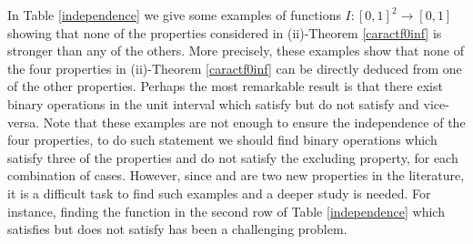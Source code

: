 In Table \ref{independence} we give some examples of functions $I:[0,1]^2\to[0,1]$ showing that none of the properties considered in (ii)-Theorem \ref{caractf0inf} is stronger than any of the others. More precisely, these examples show that none of the four properties in (ii)-Theorem \ref{caractf0inf}  can be directly deduced from one of the other properties. Perhaps the most remarkable result is that there exist binary operations in the unit interval which satisfy \LIex but do not satisfy \LIey and vice-versa. Note that these examples are not enough to ensure the independence of the four properties, to do such statement we should find binary operations which satisfy three of the properties and do not satisfy the excluding property, for each combination of cases. However, since \LIex and \LIey are two new properties in the literature, it is a difficult task to find such examples and a deeper study is needed. For instance, finding the function in the second row of Table \ref{independence} which satisfies \LIex but does not satisfy \LIey has been a challenging problem.

